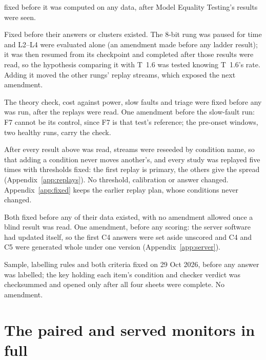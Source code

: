 \documentclass[11pt]{article}
\begin{document}
\begin{description}[leftmargin=0pt,itemsep=2pt,font=\normalfont\itshape]
  fixed before it was computed on any data, after Model Equality Testing's results
  were seen.
  \item[Fault ladder and real-traffic topics.] Fixed before their answers or
  clusters existed. The 8-bit rung was paused for time and L2--L4 were
  evaluated alone (an amendment made before any ladder result); it was then
  resumed from its checkpoint and completed after those results were read, so
  the hypothesis comparing it with T~1.6 was tested knowing T~1.6's rate.
  Adding it moved the other rungs' replay streams, which exposed the next
  amendment.
  \item[Served-answer follow-ups.] The theory check, cost against power, slow
  faults and triage were fixed before any was run, after the replays were read.
  One amendment before the slow-fault run: F7 cannot be its control, since F7 is
  that test's reference; the pre-onset windows, two healthy runs, carry the check.
  \item[Replay seeding.] After every result above was read, streams were reseeded
  by condition name, so that adding a condition never moves another's, and every
  study was replayed five times with thresholds fixed: the first replay is
  primary, the others give the spread (Appendix~\ref{app:replays}). No threshold,
  calibration or answer changed. Appendix~\ref{app:fixed} keeps the earlier
  replay plan, whose conditions never changed.
  \item[Hybrid test and blind study.] Both fixed before any of their data existed,
  with no amendment allowed once a blind result was read. One amendment, before any
  scoring: the server software had updated itself, so the first C4 answers were set
  aside unscored and C4 and C5 were generated whole under one version
  (Appendix~\ref{app:server}).
  \item[Hand-label check.] Sample, labelling rules and both criteria fixed on
  29 Oct 2026, before any answer was labelled; the key holding each item's
  condition and checker verdict was checksummed and opened only after all four
  sheets were complete. No amendment.
\end{description}

\section{The paired and served monitors in full}
\label{app:paired}
\end{document}
